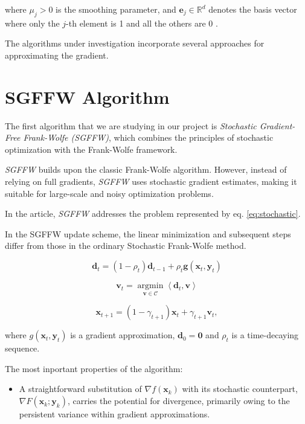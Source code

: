 \begin{multicols}{2}
where $\mu_j>0$ is the smoothing parameter, and $\mathbf{e}_j \in \mathbb{R}^d$ 
denotes the basis vector where only the $j$-th element is 1 and all the others are 0 . 

The algorithms under investigation incorporate several approaches for 
approximating the gradient.

\section{SGFFW Algorithm}

The first algorithm that we are studying in our project is 
\textit{Stochastic Gradient-Free Frank-Wolfe (SGFFW)}, which combines 
the principles of stochastic optimization with the Frank-Wolfe framework.

\textit{SGFFW} builds upon the classic Frank-Wolfe algorithm. However, 
instead of relying on full gradients, \textit{SGFFW} uses stochastic 
gradient estimates, making it suitable for large-scale and noisy 
optimization problems.

In the article, \textit{SGFFW} addresses the problem represented by 
eq. \eqref{eq:stochastic}.

In the SGFFW update scheme, the linear minimization and subsequent steps 
differ from those in the ordinary Stochastic Frank-Wolfe method.

\begin{equation}
    \mathbf{d}_t=\left(1-\rho_t\right) \mathbf{d}_{t-1}+\rho_t \mathbf{g}\left(\mathbf{x}_t, \mathbf{y}_t\right)
\label{eq:sahu-d-update}
\end{equation}
    
\begin{equation}
    \mathbf{v}_t=\underset{\mathbf{v} \in \mathcal{C}}{\operatorname{argmin}}\left\langle\mathbf{d}_t, \mathbf{v}\right\rangle 
\label{eq:sahu-v-update}
\end{equation}

\begin{equation}
    \mathbf{x}_{t+1}=\left(1-\gamma_{t+1}\right) \mathbf{x}_t+\gamma_{t+1} \mathbf{v}_t,
\label{eq:sahu-x-update}
\end{equation}

where $g\left(\mathbf{x}_t, \mathbf{y}_t\right)$ is a gradient approximation,
$\mathbf{d}_0=\mathbf{0}$ and $\rho_t$ is a time-decaying sequence.
 


The most inportant properties of the algorithm:

\begin{itemize}[left=0pt,labelindent=0pt]
    \item A straightforward substitution of $\nabla f(\mathbf{x}_k)$ with 
    its stochastic counterpart, $\nabla F(\mathbf{x}_k ; \mathbf{y}_k)$, 
    carries the potential for divergence, primarily owing to the persistent 
    variance within gradient approximations.
    

\end{itemize}
\end{multicols}

